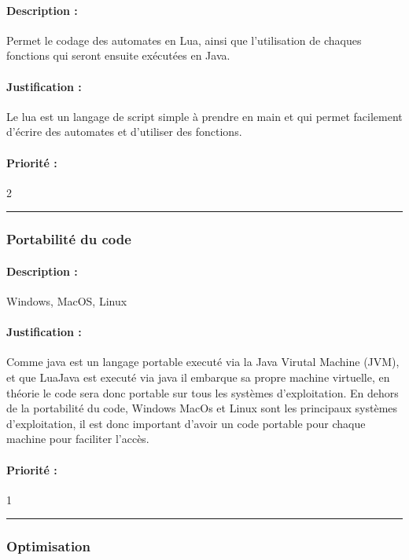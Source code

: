 \documentclass{article}%
\begin{document}
\paragraph{Description :} Permet le codage des automates en Lua, ainsi que l'utilisation de chaques fonctions qui seront ensuite exécutées en Java.

\paragraph{Justification :} Le lua est un langage de script simple à prendre en main et qui permet facilement d'écrire des automates et d'utiliser des fonctions.

\paragraph{Priorité :} 2\\

\rule{\linewidth}{1pt}

\subsubsection{Portabilité du code}

\paragraph{Description :} Windows, MacOS, Linux

\paragraph{Justification :} Comme java est un langage portable executé via la Java Virutal Machine (JVM), et que LuaJava est executé via java il embarque sa propre machine virtuelle, en théorie le code sera donc portable sur tous les systèmes d'exploitation. En dehors de la portabilité du code, Windows MacOs et Linux sont les principaux systèmes d'exploitation, il est donc important d'avoir un code portable pour chaque machine pour faciliter l'accès.

\paragraph{Priorité :} 1\\

\rule{\linewidth}{1pt}

\subsubsection{Optimisation}
\end{document}
